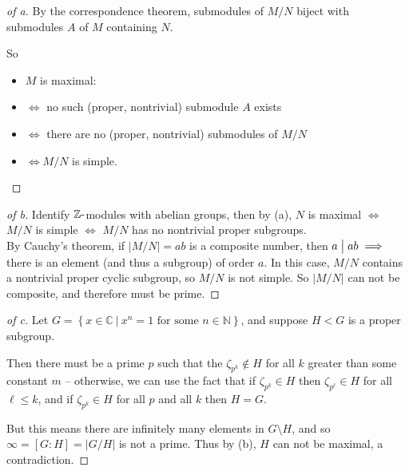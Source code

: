 \begin{solution}

\envlist

\begin{proof}[of a]

By the correspondence theorem, submodules of \(M/N\) biject with
submodules \(A\) of \(M\) containing \(N\).

So

\begin{itemize}
\item
  \(M\) is maximal:
\item
  \(\iff\) no such (proper, nontrivial) submodule \(A\) exists
\item
  \(\iff\) there are no (proper, nontrivial) submodules of \(M/N\)
\item
  \(\iff M/N\) is simple.
\end{itemize}

\end{proof}

\begin{proof}[of b]

Identify \({\mathbb{Z}}{\hbox{-}}\)modules with abelian groups, then by
(a), \(N\) is maximal \(\iff\) \(M/N\) is simple \(\iff\) \(M/N\) has no
nontrivial proper subgroups.\\

By Cauchy's theorem, if \({\left\lvert {M/N} \right\rvert} = ab\) is a
composite number, then \(a\bigm|ab \implies\) there is an element (and
thus a subgroup) of order \(a\). In this case, \(M/N\) contains a
nontrivial proper cyclic subgroup, so \(M/N\) is not simple. So
\({\left\lvert {M/N} \right\rvert}\) can not be composite, and therefore
must be prime.

\end{proof}

\begin{proof}[of c]

Let
\(G = \left\{{x \in {\mathbb{C}}{~\mathrel{\Big|}~}x^n=1 \text{ for some }n\in {\mathbb{N}}}\right\}\),
and suppose \(H < G\) is a proper subgroup.

Then there must be a prime \(p\) such that the
\(\zeta_{p^k} \not \in H\) for all \(k\) greater than some constant
\(m\) -- otherwise, we can use the fact that if \(\zeta_{p^k} \in H\)
then \(\zeta_{p^\ell} \in H\) for all \(\ell \leq k\), and if
\(\zeta_{p^k} \in H\) for all \(p\) and all \(k\) then \(H = G\).

But this means there are infinitely many elements in \(G\setminus H\),
and so \(\infty = [G: H] = {\left\lvert {G/H} \right\rvert}\) is not a
prime. Thus by (b), \(H\) can not be maximal, a contradiction.

\end{proof}

\end{solution}

